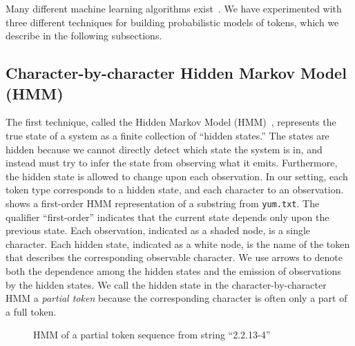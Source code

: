 Many different machine learning algorithms
exist~\cite{Seymore99learninghidden,Pinto+:texttables,borkar+:text-segmentation,rabiner89:hmm}.
We have experimented with three different techniques for 
building probabilistic models of tokens, which
we describe in the following subsections.

\subsection{Character-by-character Hidden Markov Model (HMM)}\label{subsec:hmm}

The first technique, called the Hidden Markov Model
(HMM)~\cite{rabiner89:hmm}, represents the true state of a system as a
finite collection of ``hidden states.''  The states are hidden because
we cannot directly detect which state the system is in, and instead
must try to infer the state from observing what it emits.  
Furthermore, the hidden 
state is allowed to change upon each observation.  In our setting,
each token type corresponds to a hidden state, and each character to
an observation.
 shows a first-order HMM representation of a substring
from {\tt yum.txt}.  The qualifier ``first-order'' indicates that the
current state depends only upon the previous state. 
Each observation, indicated as a shaded node, is a single character. 
Each hidden state, indicated as a white node, 
is the name of the token that describes the
corresponding observable character. We use arrows to denote
both the dependence among the hidden states and the emission of
observations by the hidden states.
We call the hidden state in the character-by-character HMM 
a {\em partial token} because the corresponding character is often
only a part of a full token.


\begin{figure}[th]
\begin{center}
\end{center}
\caption{HMM of a partial token sequence from string ``2.2.13-4''}\label{fig:hmm}
\end{figure}

